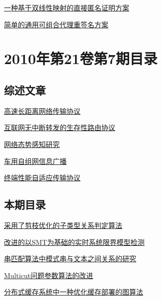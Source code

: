 \documentclass[a4paper]{article}
\begin{document}
\href{http://www.jos.org.cn/ch/reader/download_pdf.aspx?file_no=3579&year_id=2010&quarter_id=8&falg=1}{一种基于双线性映射的直接匿名证明方案}

\href{http://www.jos.org.cn/ch/reader/download_pdf.aspx?file_no=3634&year_id=2010&quarter_id=8&falg=1}{简单的通用可组合代理重签名方案}


\section{\textbf{2010年第21卷第7期目录}}
\subsection{综述文章}
\href{http://www.jos.org.cn/ch/reader/download_pdf.aspx?file_no=3812&year_id=2010&quarter_id=7&falg=1}{高速长距离网络传输协议}

\href{http://www.jos.org.cn/ch/reader/download_pdf.aspx?file_no=3816&year_id=2010&quarter_id=7&falg=1}{互联网无中断转发的生存性路由协议}

\href{http://www.jos.org.cn/ch/reader/download_pdf.aspx?file_no=3835&year_id=2010&quarter_id=7&falg=1}{网络态势感知研究}

\href{http://www.jos.org.cn/ch/reader/download_pdf.aspx?file_no=3845&year_id=2010&quarter_id=7&falg=1}{车用自组网信息广播}

\href{http://www.jos.org.cn/ch/reader/download_pdf.aspx?file_no=3853&year_id=2010&quarter_id=7&falg=1}{终端性能自适应传输协议}

\subsection{本期目录}
\href{http://www.jos.org.cn/ch/reader/download_pdf.aspx?file_no=3806&year_id=2010&quarter_id=7&falg=1}{采用了剪枝优化的子类型关系判定算法}

\href{http://www.jos.org.cn/ch/reader/download_pdf.aspx?file_no=585&year_id=2010&quarter_id=7&falg=1}{改进的以SMT为基础的实时系统限界模型检测}

\href{http://www.jos.org.cn/ch/reader/download_pdf.aspx?file_no=3613&year_id=2010&quarter_id=7&falg=1}{串匹配算法中模式串与文本之间关系的研究}

\href{http://www.jos.org.cn/ch/reader/download_pdf.aspx?file_no=3625&year_id=2010&quarter_id=7&falg=1}{Multicut问题参数算法的改进}

\href{http://www.jos.org.cn/ch/reader/download_pdf.aspx?file_no=3600&year_id=2010&quarter_id=7&falg=1}{分布式缓存系统中一种优化缓存部署的图算法}
\end{document}
